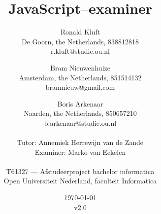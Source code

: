 
\title{JavaScript--examiner}
\author{
  Ronald Kluft\\
  De Goorn, the Netherlands, 838812818\\
  r.kluft@studie.ou.nl
  \and
  Bram Nieuwenhuize\\
  Amsterdam, the Netherlands, 851514132\\
  bramnieuw@gmail.com
  \and
  Boris Arkenaar\\
  Naarden, the Netherlands, 850657210\\
  b.arkenaar@studie.ou.nl\\
  \\
  Tutor: Annemiek Herrewijn van de Zande\\
  Examiner: Marko van Eekelen\\
  \\
  T61327 --- Afstudeerproject bachelor informatica\\
  Open Universiteit Nederland, faculteit Informatica}
\date{\today\\v2.0}
\maketitle

